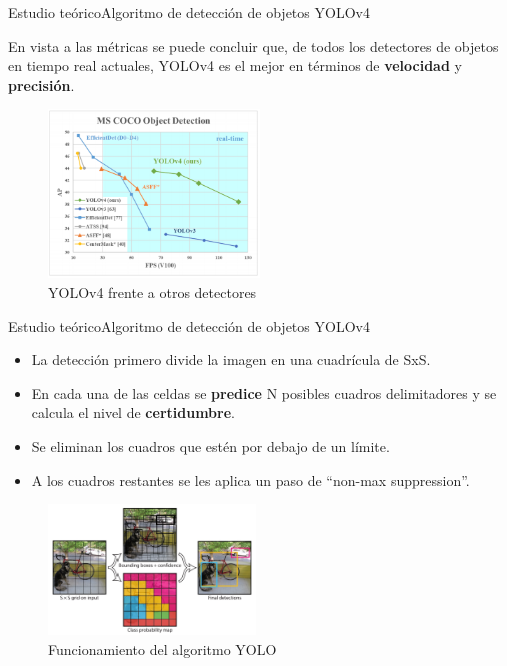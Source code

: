 \begin{frame}{Estudio teórico}{Algoritmo de detección de objetos YOLOv4}

\justifying
En vista a las métricas se puede concluir que, de todos los detectores de objetos en tiempo real actuales, YOLOv4 es el mejor en términos de \textbf{velocidad} y \textbf{precisión}.

\begin{figure}[ht]
\centering
\includegraphics[width=0.5\textwidth]{Images/estudio-teorico/yolov4-vs-others.png}
\caption{\label{fig:yolov4-vs-others}YOLOv4 frente a otros detectores}
\end{figure}

\end{frame}


\begin{frame}{Estudio teórico}{Algoritmo de detección de objetos YOLOv4}

\begin{itemize}
    \justifying
    \item La detección primero divide la imagen en una cuadrícula de SxS.
    \item En cada una de las celdas se \textbf{predice} N posibles cuadros delimitadores y se calcula el nivel de \textbf{certidumbre}.
    \item Se eliminan los cuadros que estén por debajo de un límite.
    \item A los cuadros restantes se les aplica un paso de ``non-max suppression''.
\end{itemize}

\begin{figure}[ht]
\centering
\includegraphics[width=0.49\textwidth]{Images/estudio-teorico/funcionamiento-yolo.jpg}
\caption{\label{fig:funcionamiento-yolo}Funcionamiento del algoritmo YOLO}
\end{figure}

\end{frame}


